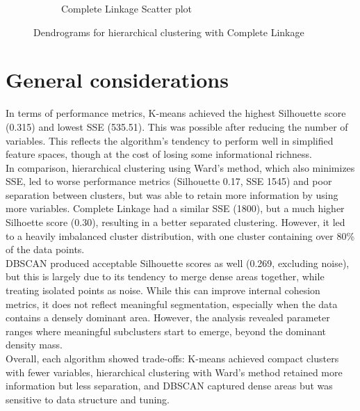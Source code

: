 \begin{figure}[H]
\begin{subfigure}[b]{0.49\textwidth}
        \caption{Complete Linkage Scatter plot}
        \label{fig:pairplot_ward_5}
    \end{subfigure}
    \caption{Dendrograms for hierarchical clustering with Complete Linkage}
    \label{fig:dendrograms_complete}
\end{figure}

\section{General considerations}\label{sec:considerations}
In terms of performance metrics, K-means achieved the highest Silhouette score (0.315) and lowest SSE (535.51). This was possible after reducing the number of variables. 
This reflects the algorithm's tendency to perform well in simplified feature spaces, though at the cost of losing some informational richness.\\
In comparison, hierarchical clustering using Ward's method, which also minimizes SSE, 
led to worse performance metrics (Silhouette 0.17, SSE 1545) and poor separation between clusters, but was able to retain more information by using more variables.
Complete Linkage had a similar SSE (1800), but a much higher Silhoette score (0.30), resulting in a better separated clustering. However, it led to a
heavily imbalanced cluster distribution, with one cluster containing over 80\% of the data points.\\
DBSCAN produced acceptable Silhouette scores as well (0.269, excluding noise), 
but this is largely due to its tendency to merge dense areas together, while treating isolated points as noise. 
While this can improve internal cohesion metrics, it does not reflect meaningful segmentation, especially when the data contains a densely dominant area. 
However, the analysis revealed parameter ranges where meaningful subclusters start to emerge, beyond the dominant density mass.\\
Overall, each algorithm showed trade-offs: K-means achieved compact clusters with fewer variables, 
hierarchical clustering with Ward's method retained more information but less separation, 
and DBSCAN captured dense areas but was sensitive to data structure and tuning.



